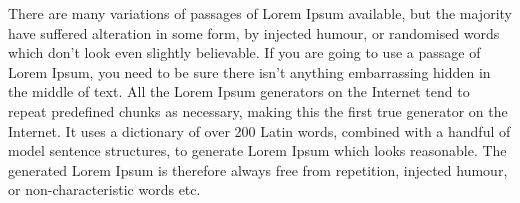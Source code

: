 There are many variations of passages of Lorem Ipsum available, but the majority have suffered alteration in some form, by injected humour, or randomised words which don't look even slightly believable. If you are going to use a passage of Lorem Ipsum, you need to be sure there isn't anything embarrassing hidden in the middle of text. All the Lorem Ipsum generators on the Internet tend to repeat predefined chunks as necessary, making this the first true generator on the Internet. It uses a dictionary of over 200 Latin words, combined with a handful of model sentence structures, to generate Lorem Ipsum which looks reasonable. The generated Lorem Ipsum is therefore always free from repetition, injected humour, or non-characteristic words etc.
